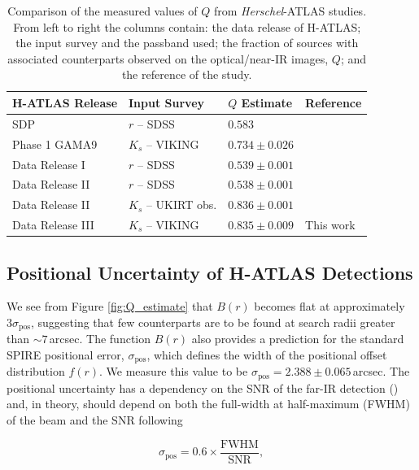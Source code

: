 \begin{table}
\centering
\begin{tabular}{p{3.5cm}|p{3.5cm}|p{2.5cm}|p{3.75cm}}
    \hline
    \hline
    H-ATLAS Release & Input Survey & $Q$ Estimate & Reference \\
    \hline
    \hline
    SDP & $r$ -- SDSS & $0.583$ & \citealt{Smith_2011} \\ 
    Phase 1 GAMA9 & $K_s$ -- VIKING & $0.734\pm0.026$ & \citealt{Fleuren_2012} \\
    Data Release I & $r$ -- SDSS & $0.539\pm0.001$ & \citealt{Bourne_2016} \\
    Data Release II & $r$ -- SDSS & $0.538\pm0.001$ & \citealt{Furlanetto_2018} \\
    Data Release II & $K_s$ -- UKIRT obs. & $0.836\pm0.001$ & \citealt{Furlanetto_2018} \\
    Data Release III & $K_s$ -- VIKING & $0.835\pm0.009$ & This work \\
    \hline
\end{tabular}
\caption[Comparison of optical/near-IR surveys used in H-ATLAS studies]{Comparison of the measured values of $Q$ from \textit{Herschel}-ATLAS studies. From left to right the columns contain: the data release of H-ATLAS; the input survey and the passband used; the fraction of sources with associated counterparts observed on the optical/near-IR images, $Q$; and the reference of the study.}
\label{tab:data_release_input_surveys}
\end{table}

\subsection{Positional Uncertainty of H-ATLAS Detections}

We see from Figure \ref{fig:Q_estimate} that $B(r)$ becomes flat at approximately $3\sigma_{\textrm{pos}}$, suggesting that few counterparts are to be found at search radii greater than $\sim 7\,$arcsec. The function $B(r)$ also provides a prediction for the standard SPIRE positional error, $\sigma_{\textrm{pos}}$, which defines the width of the positional offset distribution $f(r)$. We measure this value to be $\sigma_{\textrm{pos}} = 2.388\pm0.065\,$arcsec. The positional uncertainty has a dependency on the SNR of the far-IR detection (\citealt{Bourne_2016}) and, in theory, should depend on both the full-width at half-maximum (FWHM) of the beam and the SNR following

\begin{equation}
    \sigma_{\textrm{pos}} = 0.6\times\frac{\textrm{FWHM}}{\textrm{SNR}},
\label{eq:positional_uncertainty_theory}
\end{equation}

